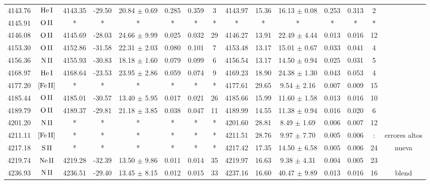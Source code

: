 \documentclass{article}
\begin{document}
\begin{table*}
\begin{adjustbox}{width=\textwidth}
\begin{tabular}{ccccccccccccccc}
4143.76 & $\mbox{He}\thinspace \mbox{I}$ & 4143.35 & -29.50 & 20.84 $\pm$ 0.69 & 0.285 & 0.359 & 3 & 4143.97 & 15.36 & 16.13 $\pm$ 0.08 & 0.253 & 0.313 & 2 &  \\
4145.91 & $\mbox{O}\thinspace \mbox{II}$ & * & * & * & * & * & * & * & * & * & * & * & * &  \\
4146.08 & $\mbox{O}\thinspace \mbox{II}$ & 4145.69 & -28.03 & 24.66 $\pm$ 9.99 & 0.025 & 0.032 & 29 & 4146.27 & 13.91 & 22.49 $\pm$ 4.44 & 0.013 & 0.016 & 12 &  \\
4153.30 & $\mbox{O}\thinspace \mbox{II}$ & 4152.86 & -31.58 & 22.31 $\pm$ 2.03 & 0.080 & 0.101 & 7 & 4153.48 & 13.17 & 15.01 $\pm$ 0.67 & 0.033 & 0.041 & 4 &  \\
4156.36 & $\mbox{N}\thinspace \mbox{II}$ & 4155.93 & -30.83 & 18.18 $\pm$ 1.60 & 0.079 & 0.099 & 6 & 4156.54 & 13.17 & 14.50 $\pm$ 0.94 & 0.025 & 0.031 & 5 &  \\
4168.97 & $\mbox{He}\thinspace \mbox{I}$ & 4168.64 & -23.53 & 23.95 $\pm$ 2.86 & 0.059 & 0.074 & 9 & 4169.23 & 18.90 & 24.38 $\pm$ 1.30 & 0.043 & 0.053 & 4 &  \\
4177.20 & $\mbox{[Fe}\thinspace \mbox{II]}$ & * & * & * & * & * & * & 4177.61 & 29.65 & 9.54 $\pm$ 2.16 & 0.007 & 0.009 & 15 &  \\
4185.44 & $\mbox{O}\thinspace \mbox{II}$ & 4185.01 & -30.57 & 13.40 $\pm$ 5.95 & 0.017 & 0.021 & 26 & 4185.66 & 15.99 & 11.60 $\pm$ 1.58 & 0.013 & 0.016 & 10 &  \\
4189.79 & $\mbox{O}\thinspace \mbox{II}$ & 4189.37 & -29.81 & 21.18 $\pm$ 3.85 & 0.038 & 0.047 & 11 & 4189.99 & 14.55 & 11.38 $\pm$ 0.94 & 0.016 & 0.020 & 6 &  \\
4201.20 & $\mbox{N}\thinspace \mbox{II}$ & * & * & * & * & * & * & 4201.60 & 28.81 & 8.49 $\pm$ 1.69 & 0.006 & 0.007 & 12 &  \\
4211.11 & $\mbox{[Fe}\thinspace \mbox{II]}$ & * & * & * & * & * & * & 4211.51 & 28.76 & 9.97 $\pm$ 7.70 & 0.005 & 0.006 & : &  errores altos \\
4217.18 & $\mbox{S}\thinspace \mbox{II}$ & * & * & * & * & * & * & 4217.42 & 17.35 & 14.50 $\pm$ 6.58 & 0.005 & 0.006 & 24 &  nueva \\
4219.74 & $\mbox{Ne}\thinspace \mbox{II}$ & 4219.28 & -32.39 & 13.50 $\pm$ 9.86 & 0.011 & 0.014 & 35 & 4219.97 & 16.63 & 9.38 $\pm$ 4.31 & 0.004 & 0.005 & 23 &  \\
4236.93 & $\mbox{N}\thinspace \mbox{II}$ & 4236.51 & -29.40 & 13.45 $\pm$ 8.15 & 0.012 & 0.015 & 33 & 4237.16 & 16.60 & 40.47 $\pm$ 9.89 & 0.013 & 0.016 & 16 &  blend \\

\end{tabular}
\end{adjustbox}
\end{table*}
\end{document}
